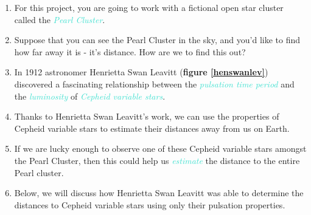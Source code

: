 \documentclass{article}
\begin{document}
    \begin{enumerate}[label=\color{turquoise}\theenumi]

        

        \item For this project, you are going to work with a fictional open star cluster called the \emph{\textcolor{turquoise}{Pearl Cluster}}.
        
        \item Suppose that you can see the Pearl Cluster in the sky, and you'd like to find how far away it is - it's distance. How are we to find this out? 
        
        \item In 1912 astronomer Henrietta Swan Leavitt (\textbf{figure \ref{henswanlev}}) discovered a fascinating relationship between the \emph{\textcolor{turquoise}{pulsation time period}} and the \emph{\textcolor{turquoise}{luminosity}} of \emph{\textcolor{turquoise}{Cepheid variable stars}}.
        
        \item Thanks to Henrietta Swan Leavitt's work, we can use the properties of Cepheid variable stars to estimate their distances away from us on Earth. 
        
        \item If we are lucky enough to observe one of these Cepheid variable stars amongst the Pearl Cluster, then this could help us \emph{\textcolor{turquoise}{estimate}} the distance to the entire Pearl cluster.
        
        \item Below, we will discuss how Henrietta Swan Leavitt was able to determine the distances to Cepheid variable stars using only their pulsation properties.
        
        
    \end{enumerate}
    
\end{document}
